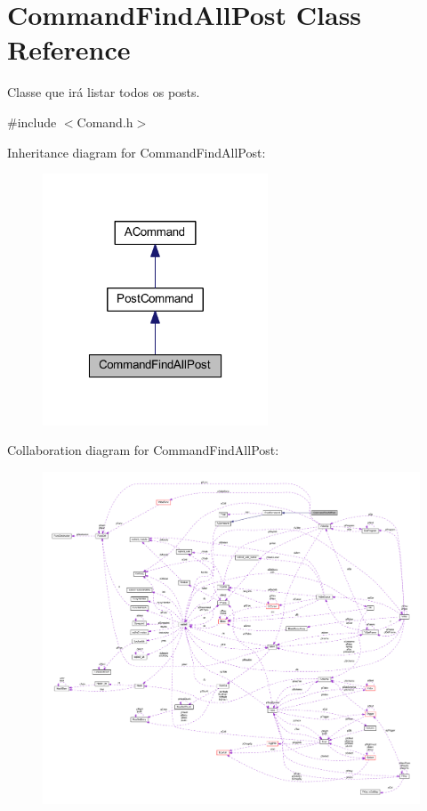 \hypertarget{class_command_find_all_post}{\section{Command\-Find\-All\-Post Class Reference}
\label{class_command_find_all_post}
}


Classe que irá listar todos os posts.  




{\ttfamily \#include $<$Comand.\-h$>$}



Inheritance diagram for Command\-Find\-All\-Post\-:\nopagebreak
\begin{figure}[H]
\begin{center}
\leavevmode
\includegraphics[width=190pt]{class_command_find_all_post__inherit__graph}
\end{center}
\end{figure}


Collaboration diagram for Command\-Find\-All\-Post\-:\nopagebreak
\begin{figure}[H]
\begin{center}
\leavevmode
\includegraphics[width=350pt]{class_command_find_all_post__coll__graph}
\end{center}
\end{figure}

